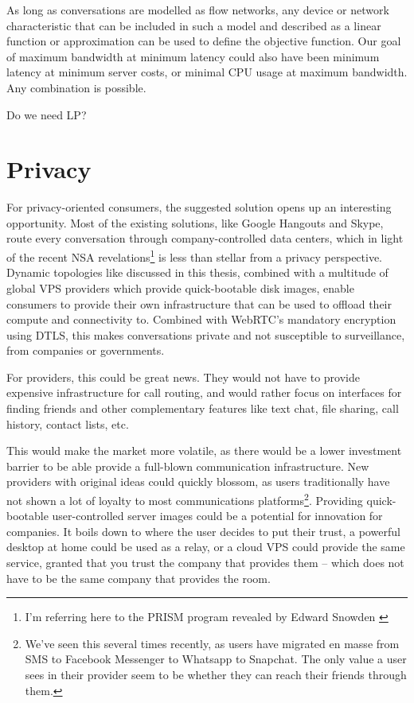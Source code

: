 As long as conversations are modelled as flow networks, any device or network characteristic that can be included in such a model and described as a linear function or approximation can be used to define the objective function. Our goal of maximum bandwidth at minimum latency could also have been minimum latency at minimum server costs, or minimal CPU usage at maximum bandwidth. Any combination is possible.

Do we need LP?



\section{Privacy}

For privacy-oriented consumers, the suggested solution opens up an interesting opportunity. Most of the existing solutions, like Google Hangouts and Skype, route every conversation through company-controlled data centers, which in light of the recent NSA revelations\footnote{I'm referring here to the PRISM program revealed by Edward Snowden \cite{prism}} is less than stellar from a privacy perspective. Dynamic topologies like discussed in this thesis, combined with a multitude of global VPS providers which provide quick-bootable disk images, enable consumers to provide their own infrastructure that can be used to offload their compute and connectivity to. Combined with WebRTC's mandatory encryption using DTLS, this makes conversations private and not susceptible to surveillance, from companies or governments.

For providers, this could be great news. They would not have to provide expensive infrastructure for call routing, and would rather focus on interfaces for finding friends and other complementary features like text chat, file sharing, call history, contact lists, etc.

This would make the market more volatile, as there would be a lower investment barrier to be able provide a full-blown communication infrastructure. New providers with original ideas could quickly blossom, as users traditionally have not shown a lot of loyalty to most communications platforms\footnote{We've seen this several times recently, as users have migrated en masse from SMS to Facebook Messenger to Whatsapp to Snapchat. The only value a user sees in their provider seem to be whether they can reach their friends through them.}. Providing quick-bootable user-controlled server images could be a potential for innovation for companies. It boils down to where the user decides to put their trust, a powerful desktop at home could be used as a relay, or a cloud VPS could provide the same service, granted that you trust the company that provides them -- which does not have to be the same company that provides the room.

